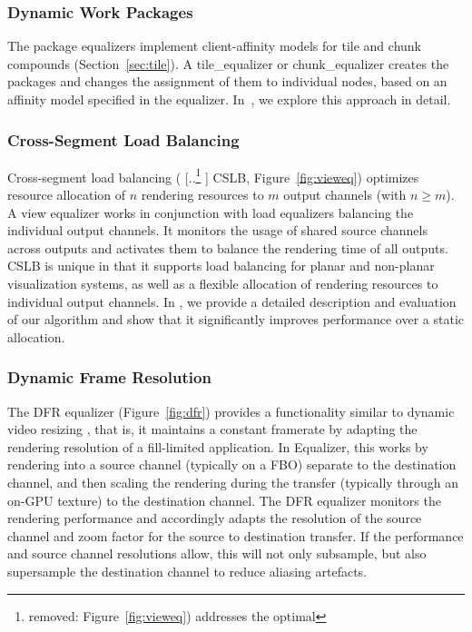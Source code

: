 \documentclass[10pt,journal,compsoc]{IEEEtran}
\newcommand{\sref}[1]{Section~\ref{#1}}
\newcommand{\fig}[1]{Figure~\ref{#1}}
\providecommand{\DIFaddtex}[1]{{\protect\color{blue} \sf #1}} %
\providecommand{\DIFdeltex}[1]{{\protect\color{red} [..\footnote{removed: #1} ]}} %
\providecommand{\DIFaddbegin}{} %
\providecommand{\DIFaddend}{} %
\providecommand{\DIFdelbegin}{} %
\providecommand{\DIFdelend}{} %
\providecommand{\DIFadd}[1]{\texorpdfstring{\DIFaddtex{#1}}{#1}} %
\providecommand{\DIFdel}[1]{\texorpdfstring{\DIFdeltex{#1}}{}} %
\newcommand{\DIFscaledelfig}{0.5}
\newlength{\DIFdelgraphicswidth} %
\newlength{\DIFdelgraphicsheight} %
\newcommand{\DIFaddincludegraphics}[2][]{{\color{blue}\fbox{\DIFOincludegraphics[#1]{#2}}}} %
\newcommand{\DIFdelincludegraphics}[2][]{%
\sbox{\DIFdelgraphicsbox}{\DIFOincludegraphics[#1]{#2}}%
\settoboxwidth{\DIFdelgraphicswidth}{\DIFdelgraphicsbox} %
\settoboxtotalheight{\DIFdelgraphicsheight}{\DIFdelgraphicsbox} %
\scalebox{\DIFscaledelfig}{%
\parbox[b]{\DIFdelgraphicswidth}{\usebox{\DIFdelgraphicsbox}\\[-\baselineskip] \rule{\DIFdelgraphicswidth}{0em}}\llap{\resizebox{\DIFdelgraphicswidth}{\DIFdelgraphicsheight}{%
\setlength{\unitlength}{\DIFdelgraphicswidth}%
\begin{picture}(1,1)%
\thicklines\linethickness{2pt} %
{\color[rgb]{1,0,0}\put(0,0){\framebox(1,1){}}}%
{\color[rgb]{1,0,0}\put(0,0){\line( 1,1){1}}}%
{\color[rgb]{1,0,0}\put(0,1){\line(1,-1){1}}}%
\end{picture}%
}\hspace*{3pt}}} %
} %
\DeclareRobustCommand{\DIFaddbegin}{\DIFOaddbegin \let\includegraphics\DIFaddincludegraphics} %
\DeclareRobustCommand{\DIFaddend}{\DIFOaddend \let\includegraphics\DIFOincludegraphics} %
\DeclareRobustCommand{\DIFdelbegin}{\DIFOdelbegin \let\includegraphics\DIFdelincludegraphics} %
\DeclareRobustCommand{\DIFdelend}{\DIFOaddend \let\includegraphics\DIFOincludegraphics} %
\begin{document}
\subsubsection{Dynamic Work Packages}

The package equalizers implement client-affinity models for tile and chunk
compounds (\sref{sec:tile}). A \textsf{tile\_equalizer} or
\textsf{chunk\_equalizer} creates the packages and changes the assignment of them
to individual nodes, based on an affinity model specified in the equalizer.
In~\cite{SPEP:16}, we explore this approach in detail.

\subsubsection{Cross-Segment Load Balancing}

Cross-segment load balancing (\DIFdelbegin \DIFdel{\fig{fig:vieweq}) addresses the optimal }\DIFdelend \DIFaddbegin \DIFadd{CSLB, \fig{fig:vieweq}) optimizes }\DIFaddend resource
allocation of $n$ rendering resources to $m$ output channels (with $n\geq m$).
A view equalizer works in conjunction with load equalizers balancing the
individual output channels. It monitors the usage of shared source channels
across outputs and activates them to balance the rendering time of all outputs.
\DIFaddbegin \DIFadd{CSLB is unique in that it supports load balancing for planar and non-planar
visualization systems, as well as a flexible allocation of rendering resources
to individual output channels. }\DIFaddend In \cite{EEP:11}, we provide a detailed
description and evaluation of our algorithm \DIFaddbegin \DIFadd{and show that it significantly
improves performance over a static allocation}\DIFaddend .

\subsubsection{Dynamic Frame Resolution}

The DFR equalizer (\fig{fig:dfr}) provides a functionality similar to dynamic
video resizing \cite{MBDM:97}, that is, it maintains a constant framerate by
adapting the rendering resolution of a fill-limited application. In
\textsf{Equalizer}, this works by rendering into a source channel (typically on
a FBO) separate to the destination channel, and then scaling the rendering
during the transfer (typically through an on-GPU texture) to the destination
channel. The DFR equalizer monitors the rendering performance and accordingly
adapts the resolution of the source channel and zoom factor for the source to
destination transfer. If the performance and source channel resolutions allow,
this will not only subsample, but also supersample the destination channel to
reduce aliasing artefacts.
\end{document}
